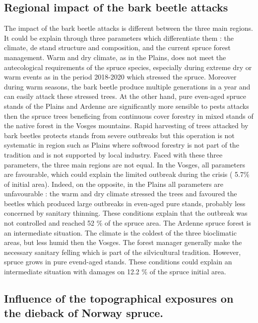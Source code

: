 \documentclass[3p,procedia]{elsarticle}
\begin{document}
\subsection{Regional impact of the bark beetle attacks}
The  impact of the bark beetle attacks is different between the three main regions.
It could be explain through three parameters which differentiate them : the climate, de stand structure and composition, and the current spruce forest management.
Warm and dry climate, as in the Plains, does not meet the autecological requirements of the spruce species, especially during extreme dry or warm events as in the period 2018-2020 \citep{rousi_accelerated_2022} which stressed the spruce. Moreover during warm seasons, the bark beetle produce multiple generations in a year \citep{annila_influence_1969,baier_phenipscomprehensive_2007} and can easily attack these stressed trees.
At the other hand, pure even-aged spruce stands of the Plains and Ardenne are significantly more sensible to pests attacks \citep{faccoli_composition_2014,jactel_2021} then the spruce trees beneficing from continuous cover forestry in mixed stands of the native forest in the Vosges mountains.
Rapid harvesting of trees attacked by bark beetles protects stands from severe outbreaks \citep{stadelmann_effects_2013} but this operation is not systematic in region such as Plains where softwood forestry is not part of the tradition and is not supported by local industry.
Faced with these three parameters, the three main regions are not equal.
In the Vosges, all parameters are favourable, which could explain the limited outbreak during the crisis ( 5.7\% of initial area).
Indeed, on the opposite, in the Plains all parameters are unfavourable : the warm and dry climate stressed the trees and favoured the beetles which produced large outbreaks in even-aged pure stands, probably less concerned by sanitary thinning. 
These conditions explain that the outbreak was not controlled and reached 52 \% of the spruce area.
The Ardenne spruce forest is an intermediate situation.
The climate is the coldest of the three bioclimatic areas, but less humid then the Vosges.
The forest manager generally make the necessary sanitary felling which is part of the silvicultural tradition.
However, spruce grows in pure evend-aged stands.
These conditions could explain an intermediate situation with damages on 12.2 \% of the spruce initial area.


\subsection{Influence of the topographical exposures on the dieback of Norway spruce.}
\end{document}
